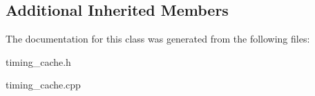\subsection*{Additional Inherited Members}


The documentation for this class was generated from the following files\-:\begin{DoxyCompactItemize}
\item 
timing\-\_\-cache.\-h\item 
timing\-\_\-cache.\-cpp\end{DoxyCompactItemize}
